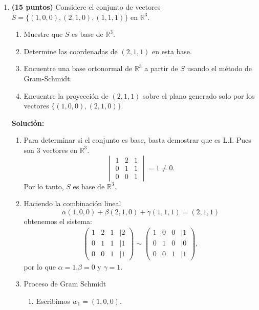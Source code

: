 \documentclass[a4paper]{article}
\theoremstyle{exampstyle}
\theoremstyle{definition}
\begin{document}
\begin{enumerate}
\newpage
    \item {\bf (15 puntos)} Considere el conjunto de vectores $S = \{( 1 , 0 , 0 ), ( 2 , 1 , 0 ) , ( 1 , 1 , 1 )\}$ en $\mathbb{R}^{3}$.
\begin{enumerate}
    \item Muestre que $S$ es base de $\mathbb{R}^{3}$.
    \item Determine las coordenadas de $ ( 2 , 1 , 1 )$ en esta base.
    \item Encuentre una base ortonormal de $\mathbb{R}^{3}$ a partir de $S$ usando el método de Gram-Schmidt.
    \item Encuentre la proyección de $ ( 2 , 1 , 1 )$ sobre el plano generado solo por los vectores $\{( 1 , 0 , 0 ), ( 2 , 1 , 0 )\}$.
\end{enumerate} 
  \textbf{Soluci\'on:} 
  \begin{enumerate}
      \item Para determinar si el conjunto es base, basta demostrar que es L.I. Pues son 3 vectores en $\mathbb{R}^3$.
\[    \begin{vmatrix} 1 &2 & 1 \\ 0 & 1 & 1 \\ 0 & 0 & 1 \end{vmatrix}=1\neq 0.\]
Por lo tanto, $S$ es base de $\mathbb{R}^3$.
\item Haciendo la combinación lineal
\[\alpha ( 1 , 0 , 0 )+\beta( 2 , 1 , 0 ) +\gamma ( 1 , 1 , 1 )=(2,1,1)\]
obtenemos el sistema:
\begin{align*}
    \begin{pmatrix} 1 &2 & 1 &|2\\ 0 & 1 & 1&|1 \\ 0 & 0 & 1&|1 \end{pmatrix}
\sim
    \begin{pmatrix} 1 &0 & 0 &|1\\ 0 & 1 & 0&|0 \\ 0 & 0 & 1&|1 \end{pmatrix},
\end{align*}
por lo que $\alpha=1$,$\beta=0$ y $\gamma=1$.
\item Proceso de Gram Schmidt
\begin{enumerate}
\item Escribimos $w_1 = ( 1 , 0 , 0 )$. 


\end{enumerate}
\end{enumerate}
\end{enumerate}
\end{document}
